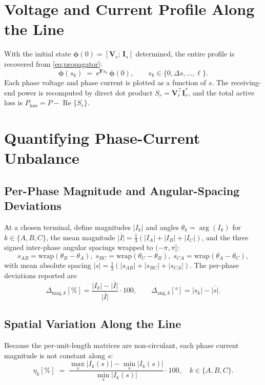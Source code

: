 \documentclass[11pt,a4paper]{article}
\newcommand{\ee}{\mathrm{e}}
\newcommand{\matF}{\bm{F}}
\newcommand{\vV}{\bm{V}}
\newcommand{\vI}{\bm{I}}
\newcommand{\vphi}{\bm{\phi}}
\renewcommand{\Re}{\operatorname{Re}}
\begin{document}
\section{Voltage and Current Profile Along the Line}

With the initial state \(\vphi(0)=[\vV_{s};\,\vI_{s}]\) determined, the entire
profile is recovered from \eqref{eq:propagator}:
\begin{equation}
\vphi(s_{k})\;=\;\ee^{\matF s_{k}}\,\vphi(0),
\qquad s_{k}\in\{0,\Delta s,\dots,\ell\}.
\end{equation}
Each phase voltage and phase current is plotted as a function of \(s\). The
receiving-end power is recomputed by direct dot product
\(S_{r}=\vV_{r}^{\!\top}\vI_{r}^{*}\), and the total active loss is
\(P_{\mathrm{loss}}=P-\Re\{S_{r}\}\).

\section{Quantifying Phase-Current Unbalance}

\subsection{Per-Phase Magnitude and Angular-Spacing Deviations}

At a chosen terminal, define magnitudes \(|I_{k}|\) and angles
\(\theta_{k}=\arg(I_{k})\) for \(k\in\{A,B,C\}\), the mean magnitude
\(\overline{|I|}=\tfrac{1}{3}(|I_{A}|+|I_{B}|+|I_{C}|)\), and the three signed
inter-phase angular spacings wrapped to \((-\pi,\pi]\):
\begin{equation}
s_{AB}=\mathrm{wrap}(\theta_{B}-\theta_{A}),\;
s_{BC}=\mathrm{wrap}(\theta_{C}-\theta_{B}),\;
s_{CA}=\mathrm{wrap}(\theta_{A}-\theta_{C}),
\end{equation}
with mean absolute spacing
\(\overline{|s|}=\tfrac{1}{3}(|s_{AB}|+|s_{BC}|+|s_{CA}|)\).
The per-phase deviations reported are
\begin{equation}
\Delta_{\mathrm{mag},k}[\%]=\frac{|I_{k}|-\overline{|I|}}{\overline{|I|}}\cdot 100,\qquad
\Delta_{\mathrm{ang},k}[\si{\degree}]=|s_{k}|-\overline{|s|}.
\label{eq:devs}
\end{equation}

\subsection{Spatial Variation Along the Line}

Because the per-unit-length matrices are non-circulant, each phase current
magnitude is not constant along \(s\):
\begin{equation}
\eta_{k}[\%]\;=\;\frac{\max_{s}|I_{k}(s)|-\min_{s}|I_{k}(s)|}{\min_{s}|I_{k}(s)|}\cdot 100,
\quad k\in\{A,B,C\}.
\label{eq:eta}
\end{equation}
\end{document}
